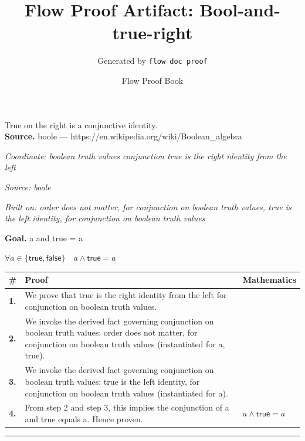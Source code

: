 \documentclass[11pt]{article}
\title{Flow Proof Artifact: Bool-and-true-right}
\author{Generated by \texttt{flow doc proof}}
\date{Flow Proof Book}
\theoremstyle{definition}
\begin{document}
\maketitle
True on the right is a conjunctive identity.\\[0.5em]
\textbf{Source.} boole — https://en.wikipedia.org/wiki/Boolean\_algebra\\[0.5em]
\bigskip
{}\par
\smallskip\noindent\textit{Coordinate: boolean truth values \cdot conjunction \cdot true is the right identity from the left}\par
\smallskip\noindent\textit{Source: boole}\par
\smallskip\noindent\textit{Built on: order does not matter, for conjunction on boolean truth values, true is the left identity, for conjunction on boolean truth values}\par
\medskip
\noindent\textbf{Goal.} a and true = a\par
\noindent$\displaystyle \forall a \in \{\mathsf{true}, \mathsf{false}\}\quad a \land \mathsf{true} = a$\par
\medskip
\noindent
\begin{tabular}{@{} >{\raggedright\arraybackslash}p{} >{\raggedright\arraybackslash}p{} >{\raggedleft\arraybackslash}p{} @{}}
\textbf{\#} & \textbf{Proof} & \textbf{Mathematics} \\
\midrule
\textbf{1.} & We prove that true is the right identity from the left for conjunction on boolean truth values. & \\[0.45em]
\textbf{2.} & We invoke the derived fact governing conjunction on boolean truth values: order does not matter, for conjunction on boolean truth values (instantiated for a, true). & \\[0.45em]
\textbf{3.} & We invoke the derived fact governing conjunction on boolean truth values: true is the left identity, for conjunction on boolean truth values (instantiated for a). & \\[0.45em]
\textbf{4.} & From step 2 and step 3, this implies the conjunction of a and true equals a. Hence proven. & $\displaystyle a \land \mathsf{true} = a$ \\[0.45em]
\bottomrule
\end{tabular}
\label{thm:Bool-conjunction-true_is_the_right_identity_from_the_left}
\par\medskip\hrule
\end{document}
